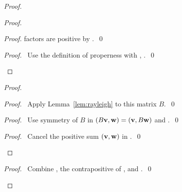 \begin{proof}
\begin{proof}
\begin{proof}
factors are positive by .~\qed\end{proof}
\qedstep
\begin{proof}\pf\ Use the definition of properness with
, .~\qed\end{proof}
\end{proof}
\begin{proof}
\begin{proof}\pf\ Apply Lemma~\ref{lem:rayleigh} to this matrix $B$.~\qed\end{proof}
\begin{proof}\pf\ Use symmetry of $B$ in $(B{\mathbf v},{\mathbf w})=({\mathbf v},B{\mathbf w})$
and .~\qed\end{proof}
\qedstep
\begin{proof}\pf\ Cancel the positive sum $({\mathbf v},{\mathbf w})$ in
.~\qed\end{proof}
\end{proof}
\qedstep
\begin{proof}\pf\ Combine , the contrapositive of
, and .~\qed\end{proof}
\end{proof}


